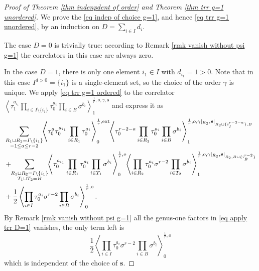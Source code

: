 \documentclass[11pt]{amsart}
\theoremstyle{definition}
\theoremstyle{remark}
\newcommand{\consta}{{\frac{1}{2}}}
\newcommand{\<}{\left<}
\renewcommand{\>}{\right>}
\numberwithin{equation}{section}
\begin{document}
\begin{proof}[Proof of Theorem \ref{thm indenpdent of order} and Theorem \ref{thm trr g=1 unordered}]
    We prove the \eqref{eq indep of choice g=1}, and hence \eqref{eq trr g=1 unordered}, by an induction on $D=\sum_{i\in I} d_i$.

    The case $D=0$ is trivially true: according to Remark \ref{rmk vanish without psi g=1} the correlators in this case are always zero.

    In the case $D=1$, there is only one element $i_1\in I$ with $d_{i_1}=1>0$. Note that in this case $I^{d>0}=\{i_1\}$ is a single-element set, so the choice of the order $\gamma$ is unique. We apply \eqref{eq trr g=1 ordered}  to the correlator $\left\langle \tau_{1}^{a_{i_1}}\prod_{i\in I\setminus \{i_1\}}\tau^{a_i}_{0}\prod_{i\in B}\sigma^{b_i}\right\rangle^{\frac{1}{r},o,\gamma,\bm{s}}_1$ and express it as 
    \begin{equation}\label{eq apply trr D=1}
        \begin{split}
    &\sum_{\substack{R_1 \sqcup R_2 = I\setminus\{i_1\}\\ -1\le a \le r-2}}\hspace{-0.1cm}\left\langle \tau_0^{a}\tau_{0}^{a_{i_1}}\prod_{i \in R_1}\tau_{0}^{a_i}\right\rangle^{\frac{1}{r},\text{ext}}_0
    \hspace{-0.1cm}\left\langle \tau_0^{r-2-a}\prod_{i\in R_2}\tau^{a_i}_{0}\prod_{i\in B}\sigma^{b_i}\right\rangle^{\frac{1}{r},o,\gamma\vert_{R_2},\bm{s}\vert_{R_2\sqcup\{i^{r-2-a}_I\},B}}_1\\
    &+\hspace{-0.1cm}\sum_{\substack{R_1 \sqcup R_2 =  I\setminus\{i_1\} \\ T_1 \sqcup T_2 =  B}} \hspace{-0.1cm} \left\langle \tau^{a_{i_1}}_{0}\prod_{i \in R_1} \tau^{a_i}_{0}\prod_{i\in T_1}\sigma^{b_i}\right\rangle^{\frac{1}{r},o}_0 \hspace{-0.1cm}\left\langle \prod_{i \in R_2} \tau^{a_i}_{0} \sigma^{r-2}\prod_{i\in T_2}\sigma^{b_i}\right\rangle^{\frac{1}{r}, o,\gamma\vert_{R_2},\bm{s}\vert_{R_2,B\sqcup\{i^{r-2}_B\}}}_1\\
    &+\consta\left\langle \prod_{i\in I}\tau^{a_i}_{0}\sigma^{r-2}\prod_{i\in B}\sigma^{b_i}\right\rangle^{\frac{1}{r},o}_0.
    \end{split}
    \end{equation}
    By Remark \ref{rmk vanish without psi g=1} all the genus-one factors in \eqref{eq apply trr D=1} vanishes, the only term left is 
    $$
    \consta\left\langle \prod_{i\in I}\tau^{a_i}_{0}\sigma^{r-2}\prod_{i\in B}\sigma^{b_i}\right\rangle^{\frac{1}{r},o}_0
    $$
    which is independent of the choice of $\bm{s}$.



\end{proof}
\end{document}
